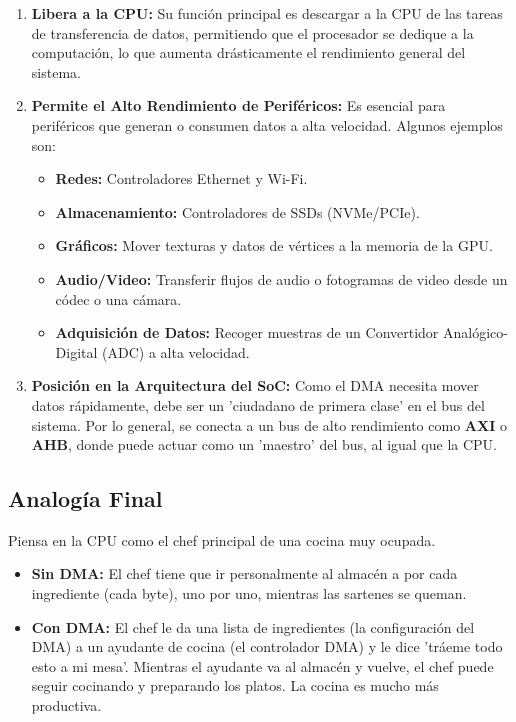 \documentclass[12pt,a4paper]{article}
\begin{document}
\begin{enumerate}
    \item \textbf{Libera a la CPU:} Su función principal es descargar a la CPU de las tareas de transferencia de datos, permitiendo que el procesador se dedique a la computación, lo que aumenta drásticamente el rendimiento general del sistema.

    \item \textbf{Permite el Alto Rendimiento de Periféricos:} Es esencial para periféricos que generan o consumen datos a alta velocidad. Algunos ejemplos son:
    \begin{itemize}
        \item \textbf{Redes:} Controladores Ethernet y Wi-Fi.
        \item \textbf{Almacenamiento:} Controladores de SSDs (NVMe/PCIe).
        \item \textbf{Gráficos:} Mover texturas y datos de vértices a la memoria de la GPU.
        \item \textbf{Audio/Video:} Transferir flujos de audio o fotogramas de video desde un códec o una cámara.
        \item \textbf{Adquisición de Datos:} Recoger muestras de un Convertidor Analógico-Digital (ADC) a alta velocidad.
    \end{itemize}

    \item \textbf{Posición en la Arquitectura del SoC:} Como el DMA necesita mover datos rápidamente, debe ser un 'ciudadano de primera clase' en el bus del sistema. Por lo general, se conecta a un bus de alto rendimiento como \textbf{AXI} o \textbf{AHB}, donde puede actuar como un 'maestro' del bus, al igual que la CPU.
\end{enumerate}

\subsection{Analogía Final}

Piensa en la CPU como el chef principal de una cocina muy ocupada.
\begin{itemize}
    \item \textbf{Sin DMA:} El chef tiene que ir personalmente al almacén a por cada ingrediente (cada byte), uno por uno, mientras las sartenes se queman.
    \item \textbf{Con DMA:} El chef le da una lista de ingredientes 
    (la configuración del DMA) a un ayudante de cocina (el controlador DMA) y 
    le dice 'tráeme todo esto a mi mesa'. Mientras el ayudante va al almacén y 
    vuelve, el chef puede seguir cocinando y preparando los platos. La cocina es 
    mucho más productiva.
\end{itemize}
\end{document}
